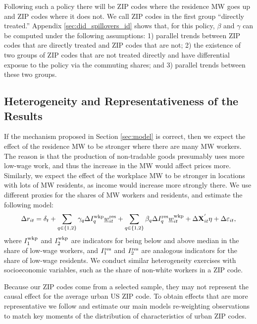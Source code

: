 Following such a policy there will be ZIP codes where the residence MW goes up
and ZIP codes where it does not.
We call ZIP codes in the first group ``directly treated.''
Appendix \ref{sec:did_spillovers_id} shows that, for this policy, 
$\beta$ and $\gamma$ can be computed under the following assumptions: 
1) parallel trends between ZIP codes that are directly treated and ZIP codes 
that are not;
2) the existence of two groups of ZIP codes that are not treated directly and
have differential exposue to the policy via the commuting shares; and 
3) parallel trends between these two groups.


\subsection{Heterogeneity and Representativeness of the Results}

If the mechanism proposed in Section \ref{sec:model} is correct, then we
expect the effect of the residence MW to be stronger where there are many MW 
workers.
The reason is that the production of non-tradable goods presumably uses more
low-wage work, and thus the increase in the MW would affect prices more.
Similarly, we expect the effect of the workplace MW to be stronger in locations
with lots of MW residents, as income would increase more strongly there.
We use different proxies for the shares of MW workers and residents, and 
estimate the following model:
\begin{equation}\label{eq:fd_heterogeneity}
    \Delta r_{it} = \delta_t
                  + \sum_{q\in\{1,2\}}\gamma_q \Delta I^{\text{wkp}}_q \underline{w}^{\text{res}}_{it}
                  + \sum_{q\in\{1,2\}}\beta_q \Delta I^{\text{res}}_q \underline{w}^{\text{wkp}}_{it}
                  + \Delta \mathbf{X}^{'}_{it}\eta
                  + \Delta \varepsilon_{it} ,
\end{equation}
where 
$I^{\text{wkp}}_1$ and $I^{\text{wkp}}_2$ are indicators for being below and above median 
in the share of low-wage workers, and
$I^{\text{res}}_1$ and $I^{\text{res}}_2$ are analogous indicators for the share of low-wage
residents.
We conduct similar heterogeneity exercises with socioeconomic variables, 
such as the share of non-white workers in a ZIP code.

Because our ZIP codes come from a selected sample, they may not represent
the causal effect for the average urban US ZIP code.
To obtain effects that are more representative we follow 
\textcite{Hainmueller2012} and estimate our main models re-weighting 
observations to match key moments of the distribution of characteristics of 
urban ZIP codes.

